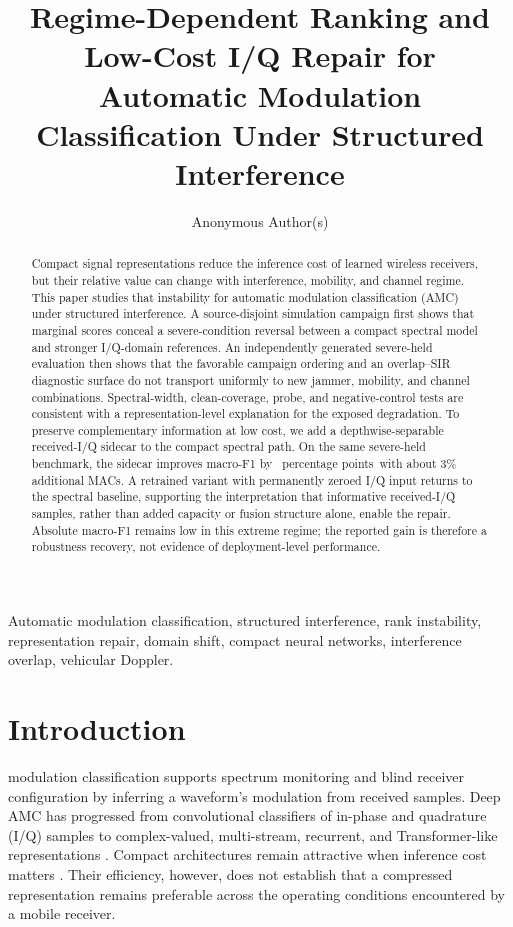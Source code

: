 \documentclass[letterpaper,journal]{IEEEtran}
\title{Regime-Dependent Ranking and Low-Cost I/Q Repair for Automatic
Modulation Classification Under Structured Interference}
\author{Anonymous Author(s)}
\newcommand{\pp}{percentage points}
\begin{document}
\maketitle

\begin{abstract}
Compact signal representations reduce the inference cost of learned wireless
receivers, but their relative value can change with interference, mobility,
and channel regime. This paper studies that instability for automatic
modulation classification (AMC) under structured interference. A
source-disjoint simulation campaign first shows that marginal scores conceal
a severe-condition reversal between a compact spectral model and stronger
I/Q-domain references. An independently generated severe-held evaluation then
shows that the favorable campaign ordering and an overlap--SIR diagnostic
surface do not transport uniformly to new jammer, mobility, and channel
combinations. Spectral-width, clean-coverage, probe, and negative-control tests
are consistent with a representation-level explanation for the exposed
degradation.
To preserve complementary information at low cost, we add a
depthwise-separable received-I/Q sidecar to the compact spectral path. On the
same severe-held benchmark, the sidecar improves macro-F1 by
\SevereRepairDiff\ \pp\ with about 3\% additional MACs. A retrained variant
with permanently zeroed I/Q input returns to the spectral baseline, supporting
the interpretation that informative received-I/Q samples, rather than added
capacity or fusion structure alone, enable the repair. Absolute macro-F1
remains low in this extreme regime; the reported gain is therefore a
robustness recovery, not evidence of deployment-level performance.
\end{abstract}

\begin{IEEEkeywords}
Automatic modulation classification, structured interference, rank
instability, representation repair, domain shift, compact neural networks,
interference overlap, vehicular Doppler.
\end{IEEEkeywords}

\section{Introduction}
 modulation classification supports spectrum
monitoring and blind receiver configuration by inferring a waveform's
modulation from received samples. Deep AMC has progressed from convolutional
classifiers of in-phase and quadrature (I/Q) samples
\cite{oshea2016cnn,meng2018amc} to complex-valued,
multi-stream, recurrent, and Transformer-like representations
\cite{tu2020complex,zhang2020dual,xu2020mcldnn,cai2022transformer,
shao2025iqformer}. Compact architectures remain attractive when inference cost
matters \cite{wang2020lightamc,efficientamc2026tgcn}. Their efficiency,
however, does not establish that a compressed representation remains
preferable across the operating conditions encountered by a mobile receiver.
\end{document}

